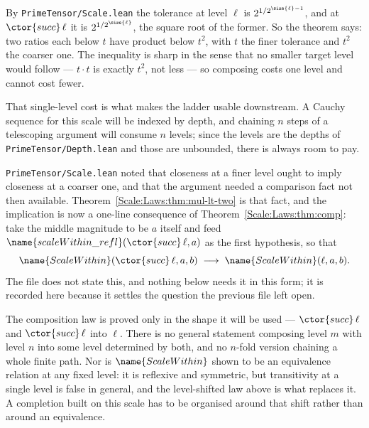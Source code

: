 \begin{remark}\label{Scale:Laws:rem:cost}
By \texttt{PrimeTensor/Scale.lean} the tolerance at level $\ell$ is
$2^{1/2^{\size{\ell}-1}}$, and at $\ctor{succ}\,\ell$ it is
$2^{1/2^{\size{\ell}}}$, the square root of the former.  So the theorem says:
two ratios each below $t$ have product below $t^2$, with $t$ the finer
tolerance and $t^2$ the coarser one.  The inequality is sharp in the sense
that no smaller target level would follow --- $t \cdot t$ is exactly $t^2$,
not less --- so composing costs one level and cannot cost fewer.

That single-level cost is what makes the ladder usable downstream.  A Cauchy
sequence for this scale will be indexed by depth, and chaining $n$ steps of a
telescoping argument will consume $n$ levels; since the levels are the depths
of \texttt{PrimeTensor/Depth.lean} and those are unbounded, there is always
room to pay.
\end{remark}

\begin{remark}
\label{Scale:Laws:rem:mono}
\texttt{PrimeTensor/Scale.lean} noted that closeness at a finer level ought to
imply closeness at a coarser one, and that the argument needed a comparison
fact not then available.  Theorem~\ref{Scale:Laws:thm:mul-lt-two} is that
fact, and the implication is now a one-line consequence of
Theorem~\ref{Scale:Laws:thm:comp}: take the middle magnitude to be $a$ itself
and feed $\name{scaleWithin\_refl}(\ctor{succ}\,\ell, a)$ as the first
hypothesis, so that
\[
  \name{ScaleWithin}(\ctor{succ}\,\ell, a, b)
  \;\longrightarrow\;
  \name{ScaleWithin}(\ell, a, b).
\]
The file does not state this, and nothing below needs it in this form; it is
recorded here because it settles the question the previous file left open.
\end{remark}

\begin{remark}\label{Scale:Laws:rem:missing}
The composition law is proved only in the shape it will be used ---
$\ctor{succ}\,\ell$ and $\ctor{succ}\,\ell$ into $\ell$.  There is no general
statement composing level $m$ with level $n$ into some level determined by
both, and no $n$-fold version chaining a whole finite path.  Nor is
$\name{ScaleWithin}$ shown to be an equivalence relation at any fixed level:
it is reflexive and symmetric, but transitivity at a single level is false in
general, and the level-shifted law above is what replaces it.  A completion
built on this scale has to be organised around that shift rather than around
an equivalence.
\end{remark}


